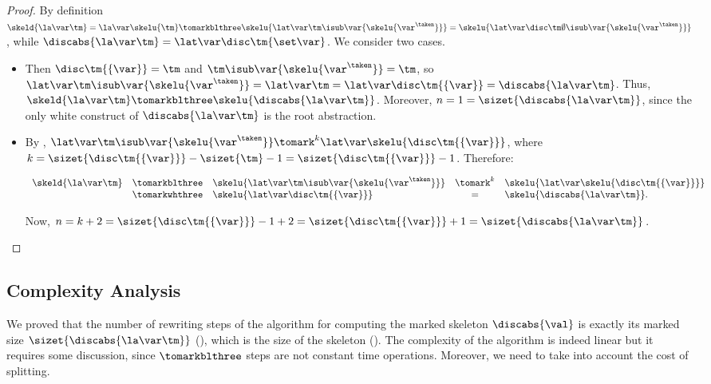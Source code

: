 \begin{proof}
By definition $\skeld{\la\var\tm} = \la\var\skelu{\tm} \tomarkblthree \skelu{\lat\var\tm\isub\var{\skelu{\var^\taken}} }= \skelu{\lat\var\disc\tm\emptyset\isub\var{\skelu{\var^\taken}}}$, while $\discabs{\la\var\tm} = \lat\var\disc\tm{\set\var}$.
We consider two cases.
\begin{itemize}
\item \case{$\var \notin \fv{\tm}$} Then $\disc\tm{\{\var\}} = \tm$ and $\tm\isub\var{\skelu{\var^\taken}} = \tm$, so $\lat\var\tm\isub\var{\skelu{\var^\taken}}=\lat\var\tm=\lat\var\disc\tm{\{\var\}}=\discabs{\la\var\tm}$. Thus, $\skeld{\la\var\tm} \tomarkblthree \skelu{\discabs{\la\var\tm}}$. Moreover, $n = 1 = \sizet{\discabs{\la\var\tm}}$, since the only white construct of $\discabs{\la\var\tm}$ is the root abstraction.

\item \case{$\var \in \fv{\tm}$}
By , $\lat\var\tm\isub\var{\skelu{\var^\taken}} \tomark^k \lat\var\skelu{\disc\tm{\{\var\}}}$, where $k = \sizet{\disc\tm{\{\var\}}} - \sizet{\tm} -1 = \sizet{\disc\tm{\{\var\}}}-1$.
Therefore:
\begin{center}
$\begin{array}{lclcll}
\skeld{\la\var\tm} & \tomarkblthree & \skelu{\lat\var\tm\isub\var{\skelu{\var^\taken}} }

& \tomark^{k} & 
\skelu{\lat\var\skelu{\disc\tm{\{\var\}}}}
\\
& \tomarkwhthree & 
\skelu{\lat\var\disc\tm{\{\var\}} }
& = & 
\skelu{\discabs{\la\var\tm}}.
\end{array}$
\end{center}
Now, $n = k + 2 = \sizet{\disc\tm{\{\var\}}} -1 +2 = \sizet{\disc\tm{\{\var\}}} +1= \sizet{\discabs{\la\var\tm}}$.\qedhere
\end{itemize}
\end{proof}


\subsection{Complexity Analysis} 
We proved that the number of rewriting steps of the algorithm for computing the marked skeleton $\discabs{\val}$ is exactly its marked size $\sizet{\discabs{\la\var\tm}}$ (), which is the size of the skeleton (). The complexity of the algorithm is indeed linear but it requires some discussion, since $\tomarkblthree$ steps are not constant time operations. Moreover, we need to take into account the cost of splitting.


